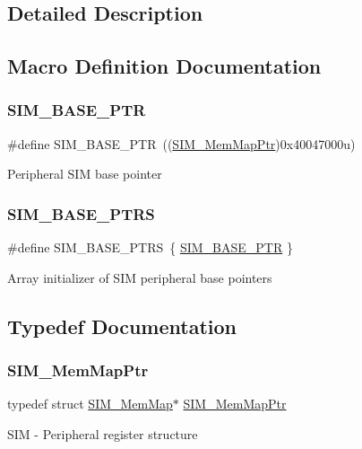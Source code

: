 \subsection{Detailed Description}


\subsection{Macro Definition Documentation}
\mbox{\label{group___s_i_m___peripheral_ga719ec5df95fbb5732438f794f2cccf3c}} 
\subsubsection{\texorpdfstring{S\+I\+M\+\_\+\+B\+A\+S\+E\+\_\+\+P\+TR}{SIM\_BASE\_PTR}}
{\footnotesize\ttfamily \#define S\+I\+M\+\_\+\+B\+A\+S\+E\+\_\+\+P\+TR~((\hyperlink{group___s_i_m___peripheral_ga708a122e8ca55082e0cf67cab6a77d02}{S\+I\+M\+\_\+\+Mem\+Map\+Ptr})0x40047000u)}

Peripheral S\+IM base pointer \mbox{\label{group___s_i_m___peripheral_ga2fd213a3b9fc7d761ab0cdeb74c34f91}} 
\subsubsection{\texorpdfstring{S\+I\+M\+\_\+\+B\+A\+S\+E\+\_\+\+P\+T\+RS}{SIM\_BASE\_PTRS}}
{\footnotesize\ttfamily \#define S\+I\+M\+\_\+\+B\+A\+S\+E\+\_\+\+P\+T\+RS~\{ \hyperlink{group___s_i_m___peripheral_ga719ec5df95fbb5732438f794f2cccf3c}{S\+I\+M\+\_\+\+B\+A\+S\+E\+\_\+\+P\+TR} \}}

Array initializer of S\+IM peripheral base pointers 

\subsection{Typedef Documentation}
\mbox{\label{group___s_i_m___peripheral_ga708a122e8ca55082e0cf67cab6a77d02}} 
\subsubsection{\texorpdfstring{S\+I\+M\+\_\+\+Mem\+Map\+Ptr}{SIM\_MemMapPtr}}
{\footnotesize\ttfamily typedef struct \hyperlink{struct_s_i_m___mem_map}{S\+I\+M\+\_\+\+Mem\+Map}$\ast$ \hyperlink{group___s_i_m___peripheral_ga708a122e8ca55082e0cf67cab6a77d02}{S\+I\+M\+\_\+\+Mem\+Map\+Ptr}}

S\+IM -\/ Peripheral register structure 